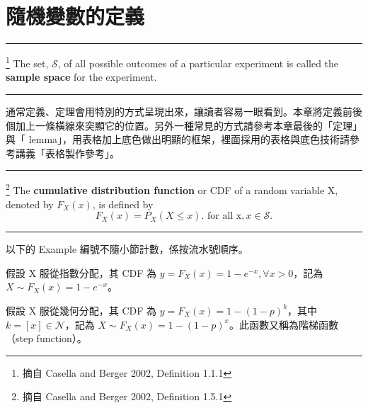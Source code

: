 \documentclass[12pt, a4paper]{article}
\begin{document}


\section{{\MB 隨機變數的定義}}
 \rule{\textwidth}{0.2pt}
 \begin{de}\footnote{摘自 Casella and Berger 2002, Definition 1.1.1}  %
The set, $\mathcal{S}$, of all possible outcomes of a particular experiment is called the \textbf{sample space} for the experiment.\\
 \rule{\textwidth}{0.2pt}
\end{de}
\noindent 通常定義、定理會用特別的方式呈現出來，讓讀者容易一眼看到。本章將定義前後個加上一條橫線來突顯它的位置。另外一種常見的方式請參考本章最後的「定理」與「 lemma」，用表格加上底色做出明顯的框架，裡面採用的表格與底色技術請參考講義「表格製作參考」。

\noindent \rule{\textwidth}{0.2pt}
\begin{de}\footnote{摘自 Casella and Berger 2002, Definition 1.5.1} %
The \textbf{cumulative distribution function}  or CDF of a random variable X, denoted by $F_X(x)$,
is defined by
\[F_X(x)=P_X(X \leq x). \mbox{ for all x}, x\in \mathcal{S}.\]
 \rule{\textwidth}{0.2pt}
\end{de}
\noindent 以下的 Example 編號不隨小節計數，係按流水號順序。
\begin{ex}[指數分配隨機變數的呈現] %
假設  X 服從指數分配，其 CDF 為 $y=F_X(x)=1-e^{-x}, \forall x>0$，記為 $X\sim F_X(x)=1-e^{-x}$。
\end{ex}

\begin{ex}[幾何分配隨機變數的呈現] %
假設 X 服從幾何分配，其 CDF 為 $y=F_X(x)=1-(1-p)^k$，其中 $k=[x]\in \mathcal{N}$，記為 $X\sim F_X(x)=1-(1-p)^x$。此函數又稱為階梯函數（step function）。
\end{ex}
\end{document}
